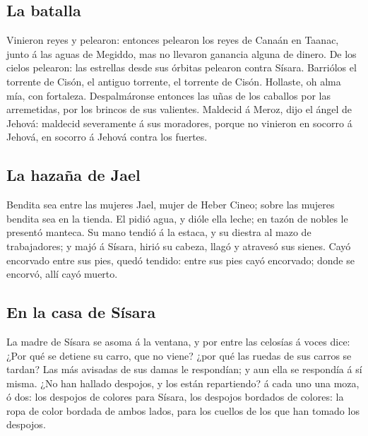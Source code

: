 \hypertarget{la-batalla}{%
\subsection{La batalla}\label{la-batalla}}

 Vinieron reyes y pelearon: entonces pelearon los reyes
de Canaán en Taanac, junto á las aguas de Megiddo, mas no llevaron
ganancia alguna de dinero.  De los cielos pelearon: las
estrellas desde sus órbitas pelearon contra Sísara. 
Barriólos el torrente de Cisón, el antiguo torrente, el torrente de
Cisón. Hollaste, oh alma mía, con fortaleza. 
Despalmáronse entonces las uñas de los caballos por las arremetidas, por
los brincos de sus valientes.  Maldecid á Meroz, dijo el
ángel de Jehová: maldecid severamente á sus moradores, porque no
vinieron en socorro á Jehová, en socorro á Jehová contra los fuertes.

\hypertarget{la-hazauxf1a-de-jael}{%
\subsection{La hazaña de Jael}\label{la-hazauxf1a-de-jael}}

 Bendita sea entre las mujeres Jael, mujer de Heber
Cineo; sobre las mujeres bendita sea en la tienda.  El
pidió agua, y dióle ella leche; en tazón de nobles le presentó manteca.
 Su mano tendió á la estaca, y su diestra al mazo de
trabajadores; y majó á Sísara, hirió su cabeza, llagó y atravesó sus
sienes.  Cayó encorvado entre sus pies, quedó tendido:
entre sus pies cayó encorvado; donde se encorvó, allí cayó muerto.

\hypertarget{en-la-casa-de-suxedsara}{%
\subsection{En la casa de Sísara}\label{en-la-casa-de-suxedsara}}

 La madre de Sísara se asoma á la ventana, y por entre
las celosías á voces dice: ¿Por qué se detiene su carro, que no viene?
¿por qué las ruedas de sus carros se tardan?  Las más
avisadas de sus damas le respondían; y aun ella se respondía á sí misma.
 ¿No han hallado despojos, y los están repartiendo? á
cada uno una moza, ó dos: los despojos de colores para Sísara, los
despojos bordados de colores: la ropa de color bordada de ambos lados,
para los cuellos de los que han tomado los despojos.

